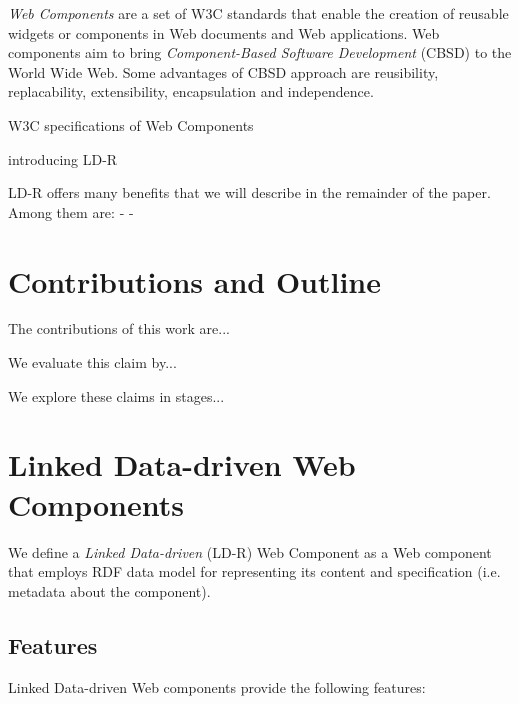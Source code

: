 \documentclass{acm_proc_article-sp}
\begin{document}
\emph{Web Components} are a set of W3C standards that enable the creation of reusable widgets or components in Web documents and Web applications.
Web components aim to bring \emph{Component-Based Software Development} (CBSD) to the World Wide Web.
Some advantages of CBSD approach are reusibility, replacability, extensibility, encapsulation and independence.

W3C specifications of Web Components \cite{webcomponentsW3C}

introducing LD-R


LD-R offers many benefits that we will describe in the remainder of the paper. Among them are:
-
-
\section{Contributions and Outline}
The contributions of this work are...

We evaluate this claim by...

We explore these claims in stages...


\section{Linked Data-driven Web Components}

\cite{Norman2013}

We define a \emph{Linked Data-driven} (LD-R) Web Component as a Web component that employs RDF data model for representing its content and specification (i.e. metadata about the component).

\subsection{Features}

Linked Data-driven Web components provide the following features:
\end{document}
